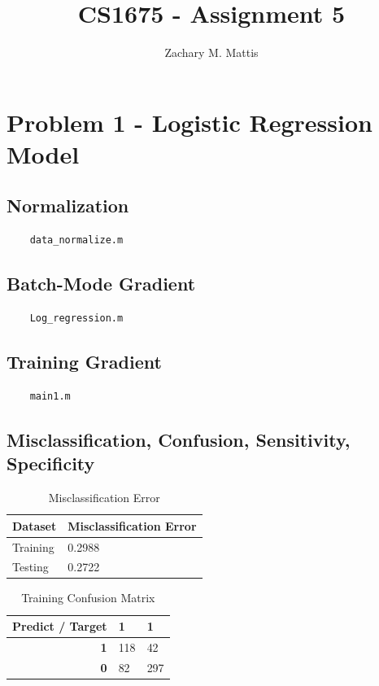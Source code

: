 \documentclass[12pt, letterpaper]{report}
\title{CS1675 - Assignment 5}
\author{Zachary M. Mattis}
\begin{document}
	
\maketitle

\section{Problem 1 - Logistic Regression Model}

\subsection{Normalization}

\begin{verbatim}
    data_normalize.m
\end{verbatim}

\subsection{Batch-Mode Gradient}

\begin{verbatim}
    Log_regression.m
\end{verbatim}


\subsection{Training Gradient}

\begin{verbatim}
    main1.m
\end{verbatim}


\subsection{Misclassification, Confusion, Sensitivity, Specificity}

\begin{table}[H]
	\centering
	\begin{tabular}{ |l|l| }
		\hline
		\textbf{Dataset} & \textbf{Misclassification Error} \\
		\hline
		Training & 0.2988 \\
		\hline
		Testing & 0.2722 \\
		\hline
	\end{tabular}
	\caption{Misclassification Error}
\end{table}

\begin{table}[H]
	\centering
	\begin{tabular}{ |r|l|l| }
		\hline
		\textbf{Predict / Target} & \textbf{1} & \textbf{1} \\
		\hline
		\textbf{1} & 118 & 42 \\
		\hline
		\textbf{0} & 82 & 297 \\
		\hline
	\end{tabular}
	\caption{Training Confusion Matrix}
\end{table}
\end{document}
